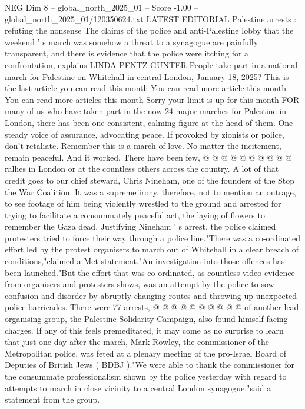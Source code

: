 \begin{textsample}{NEG Dim 8 – global\_north\_2025\_01 – Score -1.00 – global\_north\_2025\_01/120350624.txt}  \label{ex:f8_neg_163}
LATEST EDITORIAL Palestine arrests : refuting the nonsense The claims of the police and anti-Palestine lobby that the weekend ' s march was somehow a threat to a synagogue are painfully transparent, and there is evidence that the police were itching for a confrontation, explains LINDA PENTZ GUNTER People take part in a national march for Palestine on Whitehall in central London, January 18, 2025?
This is the last article you can read this month You can read more article this month You can read more articles this month Sorry your limit is up for this month FOR many of us who have taken part in the now 24 major marches for Palestine in London, there has been one consistent, calming figure at the head of them.
One steady voice of assurance, advocating peace.
If provoked by zionists or police, don't retaliate.
Remember this is a march of love.
No matter the incitement, remain peaceful.
And it worked.
There have been few, @ @ @ @ @ @ @ @ @ @ rallies in London or at the countless others across the country.
A lot of that credit goes to our chief steward, Chris Nineham, one of the founders of the Stop the War Coalition.
It was a supreme irony, therefore, not to mention an outrage, to see footage of him being violently wrestled to the ground and arrested for trying to facilitate a consummately peaceful act, the laying of flowers to remember the Gaza dead.
Justifying Nineham ' s arrest, the police claimed protesters tried to force their way through a police line."There was a co-ordinated effort led by the protest organisers to march out of Whitehall in a clear breach of conditions,"claimed a Met statement."An investigation into those offences has been launched."But the effort that was co-ordinated, as countless video evidence from organisers and protesters shows, was an attempt by the police to sow confusion and disorder by abruptly changing routes and throwing up unexpected police barricades.
There were 77 arrests, @ @ @ @ @ @ @ @ @ @ of another lead organising group, the Palestine Solidarity Campaign, also found himself facing charges.
If any of this feels premeditated, it may come as no surprise to learn that just one day after the march, Mark Rowley, the commissioner of the Metropolitan police, was feted at a plenary meeting of the pro-Israel Board of Deputies of British Jews ( BDBJ )."We were able to thank the commissioner for the consummate professionalism shown by the police yesterday with regard to attempts to march in close vicinity to a central London synagogue,"said a statement from the group.

\end{textsample}
